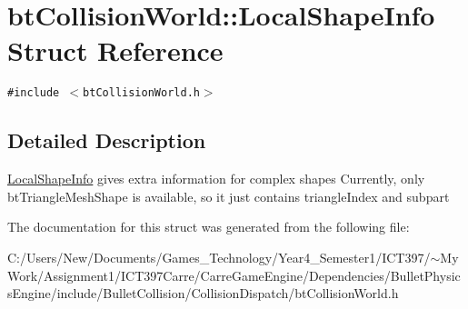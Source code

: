 \hypertarget{structbt_collision_world_1_1_local_shape_info}{
\section{btCollisionWorld::LocalShapeInfo Struct Reference}
\label{structbt_collision_world_1_1_local_shape_info}
}
{\tt \#include $<$btCollisionWorld.h$>$}



\subsection{Detailed Description}
\hyperlink{structbt_collision_world_1_1_local_shape_info}{LocalShapeInfo} gives extra information for complex shapes Currently, only btTriangleMeshShape is available, so it just contains triangleIndex and subpart 

The documentation for this struct was generated from the following file:\begin{CompactItemize}
\item 
C:/Users/New/Documents/Games\_\-Technology/Year4\_\-Semester1/ICT397/$\sim$My Work/Assignment1/ICT397Carre/CarreGameEngine/Dependencies/BulletPhysicsEngine/include/BulletCollision/CollisionDispatch/btCollisionWorld.h\end{CompactItemize}
